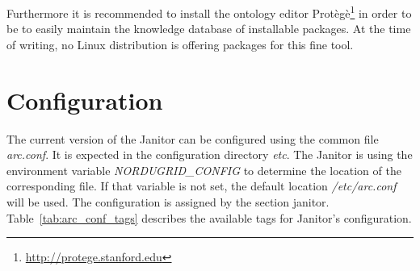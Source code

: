 Furthermore it is recommended to install the ontology editor 
Prot\`eg\`e\footnote{\href{http://protege.stanford.edu}{http://protege.stanford.edu}}
in order to be to easily maintain the knowledge database of installable packages.
At the time of writing, no Linux distribution is offering packages for this fine tool.


\section{Configuration}\label{sec:janitor_configuration}

The current version of the Janitor can be configured using the
common file \textit{arc.conf}. It is expected in the configuration
directory \textit{etc}. The Janitor is using the environment
variable \textit{NORDUGRID\_CONFIG} to determine the location of the
corresponding file. If that variable is not set, the default location
\textit{/etc/arc.conf} will be used.  The configuration is assigned
by the section \lbrack janitor\rbrack. Table~\ref{tab:arc_conf_tags}
describes the available tags for Janitor's configuration.

